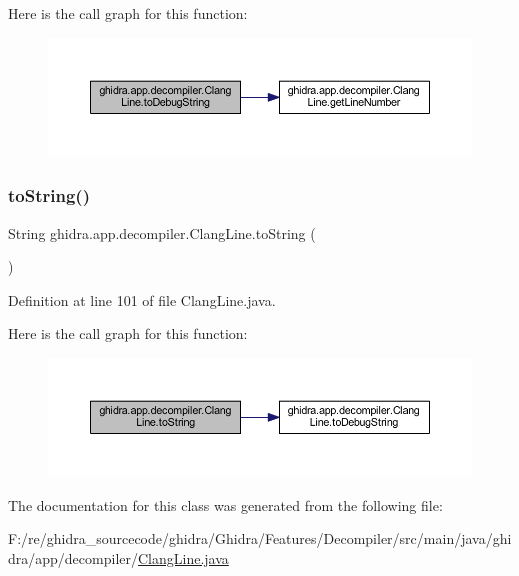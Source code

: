 Here is the call graph for this function\+:
\nopagebreak
\begin{figure}[H]
\begin{center}
\leavevmode
\includegraphics[width=350pt]{classghidra_1_1app_1_1decompiler_1_1_clang_line_a435789509abf36e99f0295ebba666853_cgraph}
\end{center}
\end{figure}
\mbox{\label{classghidra_1_1app_1_1decompiler_1_1_clang_line_a8b8fb4cac28a9572630869d11dcc0448}} 
\subsubsection{\texorpdfstring{toString()}{toString()}}
{\footnotesize\ttfamily String ghidra.\+app.\+decompiler.\+Clang\+Line.\+to\+String (\begin{DoxyParamCaption}{ }\end{DoxyParamCaption})\hspace{0.3cm}{\ttfamily [inline]}}



Definition at line 101 of file Clang\+Line.\+java.

Here is the call graph for this function\+:
\nopagebreak
\begin{figure}[H]
\begin{center}
\leavevmode
\includegraphics[width=350pt]{classghidra_1_1app_1_1decompiler_1_1_clang_line_a8b8fb4cac28a9572630869d11dcc0448_cgraph}
\end{center}
\end{figure}


The documentation for this class was generated from the following file\+:\begin{DoxyCompactItemize}
\item 
F\+:/re/ghidra\+\_\+sourcecode/ghidra/\+Ghidra/\+Features/\+Decompiler/src/main/java/ghidra/app/decompiler/\mbox{\hyperlink{_clang_line_8java}{Clang\+Line.\+java}}\end{DoxyCompactItemize}
